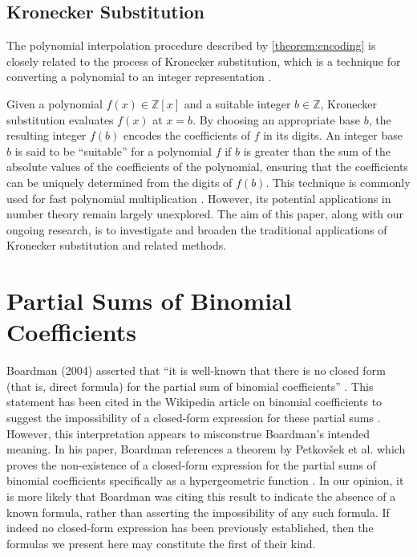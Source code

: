 \documentclass{article}
\theoremstyle{plain}
\begin{document}
\subsection{Kronecker Substitution}
The polynomial interpolation procedure described by \cref{theorem:encoding} is closely related to the process of Kronecker substitution, which is a technique for converting a polynomial to an integer representation \cite{gathen2013modern}.

Given a polynomial $f(x) \in \mathbb{Z}[x]$ and a suitable integer $b \in \mathbb{Z}$, Kronecker substitution evaluates $f(x)$ at $x = b$. By choosing an appropriate base $b$, the resulting integer $f(b)$ encodes the coefficients of $f$ in its digits. An integer base $b$ is said to be ``suitable'' for a polynomial $f$ if $b$ is greater than the sum of the absolute values of the coefficients of the polynomial, ensuring that the coefficients can be uniquely determined from the digits of $f(b)$. This technique is commonly used for fast polynomial multiplication \cite{harvey2009kronecker, harvey2019faster, albrecht2018implementing, bos2020postquantum, greuet2022modular}. However, its potential applications in number theory remain largely unexplored. The aim of this paper, along with our ongoing research, is to investigate and broaden the traditional applications of Kronecker substitution and related methods.

\section{Partial Sums of Binomial Coefficients} \label{section:partialsums}
Boardman (2004) asserted that ``it is well-known that there is no closed form (that is, direct formula) for the partial sum of binomial coefficients'' \cite{boardman2004eggdropnumbers}. This statement has been cited in the Wikipedia article on binomial coefficients to suggest the impossibility of a closed-form expression for these partial sums \cite{wikipedia2024binomialcoefficient}. However, this interpretation appears to misconstrue Boardman's intended meaning. In his paper, Boardman references a theorem by Petkovšek et al. which proves the non-existence of a closed-form expression for the partial sums of binomial coefficients specifically as a hypergeometric function \cite{petkovsek1996ab}. In our opinion, it is more likely that Boardman was citing this result to indicate the absence of a known formula, rather than asserting the impossibility of any such formula. If indeed no closed-form expression has been previously established, then the formulas we present here may constitute the first of their kind.
\end{document}
